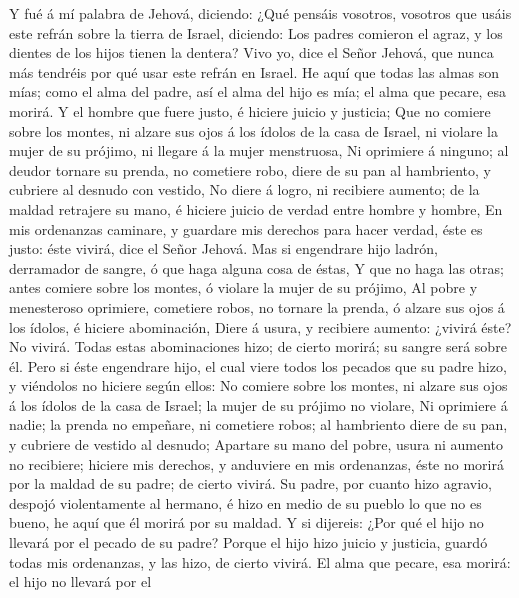  Y fué á mí palabra de Jehová, diciendo:  ¿Qué
pensáis vosotros, vosotros que usáis este refrán sobre la tierra de
Israel, diciendo: Los padres comieron el agraz, y los dientes de los
hijos tienen la dentera?  Vivo yo, dice el Señor Jehová, que
nunca más tendréis por qué usar este refrán en Israel.  He
aquí que todas las almas son mías; como el alma del padre, así el alma
del hijo es mía; el alma que pecare, esa morirá.  Y el
hombre que fuere justo, é hiciere juicio y justicia;  Que no
comiere sobre los montes, ni alzare sus ojos á los ídolos de la casa de
Israel, ni violare la mujer de su prójimo, ni llegare á la mujer
menstruosa,  Ni oprimiere á ninguno; al deudor tornare su
prenda, no cometiere robo, diere de su pan al hambriento, y cubriere al
desnudo con vestido,  No diere á logro, ni recibiere
aumento; de la maldad retrajere su mano, é hiciere juicio de verdad
entre hombre y hombre,  En mis ordenanzas caminare, y
guardare mis derechos para hacer verdad, éste es justo: éste vivirá,
dice el Señor Jehová.  Mas si engendrare hijo ladrón,
derramador de sangre, ó que haga alguna cosa de éstas,  Y
que no haga las otras; antes comiere sobre los montes, ó violare la
mujer de su prójimo,  Al pobre y menesteroso oprimiere,
cometiere robos, no tornare la prenda, ó alzare sus ojos á los ídolos, é
hiciere abominación,  Diere á usura, y recibiere aumento:
¿vivirá éste? No vivirá. Todas estas abominaciones hizo; de cierto
morirá; su sangre será sobre él.  Pero si éste engendrare
hijo, el cual viere todos los pecados que su padre hizo, y viéndolos no
hiciere según ellos:  No comiere sobre los montes, ni
alzare sus ojos á los ídolos de la casa de Israel; la mujer de su
prójimo no violare,  Ni oprimiere á nadie; la prenda no
empeñare, ni cometiere robos; al hambriento diere de su pan, y cubriere
de vestido al desnudo;  Apartare su mano del pobre, usura
ni aumento no recibiere; hiciere mis derechos, y anduviere en mis
ordenanzas, éste no morirá por la maldad de su padre; de cierto vivirá.
 Su padre, por cuanto hizo agravio, despojó violentamente
al hermano, é hizo en medio de su pueblo lo que no es bueno, he aquí que
él morirá por su maldad.  Y si dijereis: ¿Por qué el hijo
no llevará por el pecado de su padre? Porque el hijo hizo juicio y
justicia, guardó todas mis ordenanzas, y las hizo, de cierto vivirá.
 El alma que pecare, esa morirá: el hijo no llevará por el
